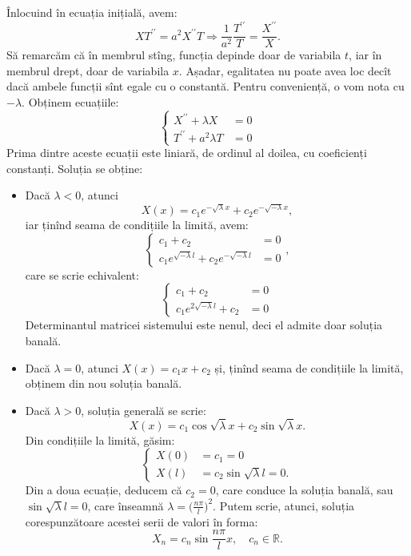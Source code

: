 \documentclass[11pt,a4paper]{article}
\newcommand\RR{\mathbb{R}}
\theoremstyle{dotless}
\theoremstyle{dotlessdr}
\begin{document}
Înlocuind în ecuația inițială, avem:
\[
  XT^{\prime\prime} = a^2X^{\prime\prime} T \Rightarrow %
  \frac{1}{a^2} \frac{T^{\prime\prime}}{T} = \frac{X^{\prime\prime}}{X}.
\]
Să remarcăm că în membrul stîng, funcția depinde doar de variabila $ t $, iar în
membrul drept, doar de variabila $ x $. Așadar, egalitatea nu poate avea loc
decît dacă ambele funcții sînt egale cu o constantă. Pentru conveniență, o vom nota
cu $ -\lambda $. Obținem ecuațiile:
\[
  \begin{cases}
    X^{\prime\prime} + \lambda X &= 0 \\
    T^{\prime\prime} + a^2\lambda T &= 0
  \end{cases}
\]
Prima dintre aceste ecuații este liniară, de ordinul al doilea, cu coeficienți
constanți. Soluția se obține:
\begin{itemize}
\item Dacă $ \lambda < 0 $, atunci
  \[
    X(x) = c_1 e^{-\sqrt{\lambda}x} + c_2 e^{-\sqrt{-\lambda} x},
  \]
  iar ținînd seama de condițiile la limită, avem:
  \[
    \begin{cases}
      c_1 + c_2 &= 0 \\
      c_1 e^{\sqrt{-\lambda} l} + c_2e^{-\sqrt{-\lambda} l} &= 0
    \end{cases},
  \]
  care se scrie echivalent:
  \[
    \begin{cases}
      c_1 + c_2 &= 0 \\
      c_1 e^{2\sqrt{-\lambda} l} + c_2 &= 0
    \end{cases}
  \]
  Determinantul matricei sistemului este nenul, deci el admite doar soluția banală.
\item Dacă $ \lambda = 0 $, atunci $ X(x) = c_1 x + c_2 $ și, ținînd seama de
  condițiile la limită, obținem din nou soluția banală.
\item Dacă $ \lambda > 0 $, soluția generală se scrie:
  \[
    X(x) = c_1 \cos \sqrt{\lambda} x + c_2 \sin \sqrt{\lambda} x.
  \]
  Din condițiile la limită, găsim:
  \[
    \begin{cases}
      X(0) &= c_1 = 0 \\
      X(l) &= c_2 \sin \sqrt{\lambda} l = 0.
    \end{cases}
  \]
  Din a doua ecuație, deducem că $ c_2 = 0 $, care conduce la soluția banală, sau
  $ \sin \sqrt{\lambda} l = 0 $, care înseamnă $ \lambda = \big(\frac{n\pi}{l}\big)^2 $.
  Putem scrie, atunci, soluția corespunzătoare acestei serii de valori în forma:
  \[
    X_n = c_n \sin \frac{n\pi}{l} x, \quad c_n \in \RR.
  \]
\end{itemize}
\end{document}
